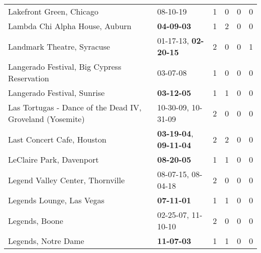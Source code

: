 \begin{longtable}{p{}p{}p{}p{}p{}p{}}
                                                     Lakefront Green, Chicago &                                                08-10-19\textsuperscript{} &  1 &  0 &  0 &  0 \\
                                               Lambda Chi Alpha House, Auburn &                                       \textbf{04-09-03\textsuperscript{}} &  1 &  2 &  0 &  0 \\
                                                   Landmark Theatre, Syracuse &           01-17-13\textsuperscript{}, \textbf{02-20-15\textsuperscript{}} &  2 &  0 &  0 &  1 \\
                                  Langerado Festival, Big Cypress Reservation &                                                03-07-08\textsuperscript{} &  1 &  0 &  0 &  0 \\
                                                  Langerado Festival, Sunrise &                                       \textbf{03-12-05\textsuperscript{}} &  1 &  1 &  0 &  0 \\
                    Las Tortugas - Dance of the Dead IV, Groveland (Yosemite) &                    10-30-09\textsuperscript{}, 10-31-09\textsuperscript{} &  2 &  0 &  0 &  0 \\
                                                   Last Concert Cafe, Houston &  \textbf{03-19-04\textsuperscript{}}, \textbf{09-11-04\textsuperscript{}} &  2 &  2 &  0 &  0 \\
                                                     LeClaire Park, Davenport &                                       \textbf{08-20-05\textsuperscript{}} &  1 &  1 &  0 &  0 \\
                                             Legend Valley Center, Thornville &                    08-07-15\textsuperscript{}, 08-04-18\textsuperscript{} &  2 &  0 &  0 &  0 \\
                                                    Legends Lounge, Las Vegas &                                       \textbf{07-11-01\textsuperscript{}} &  1 &  1 &  0 &  0 \\
                                                               Legends, Boone &                    02-25-07\textsuperscript{}, 11-10-10\textsuperscript{} &  2 &  0 &  0 &  0 \\
                                                          Legends, Notre Dame &                                       \textbf{11-07-03\textsuperscript{}} &  1 &  1 &  0 &  0 \\

\end{longtable}

